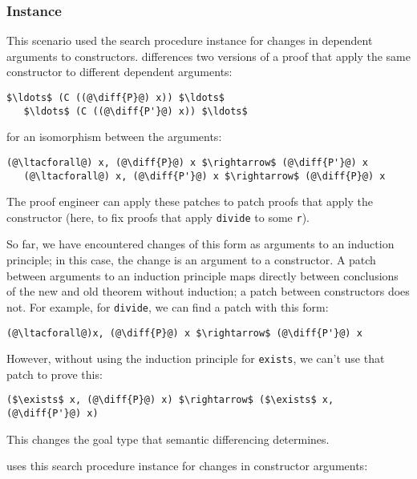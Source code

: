\subsubsection*{Instance}

This scenario used the search procedure instance for changes in dependent arguments to constructors.
\sysname differences two versions of a proof that apply the same constructor
to different dependent arguments:

\begin{lstlisting}[language=coq]
   $\ldots$ (C ((@\diff{P}@) x)) $\ldots$
   $\ldots$ (C ((@\diff{P'}@) x)) $\ldots$
\end{lstlisting}
for an isomorphism between the arguments:

\begin{lstlisting}[language=coq]
   (@\ltacforall@) x, (@\diff{P}@) x $\rightarrow$ (@\diff{P'}@) x
   (@\ltacforall@) x, (@\diff{P'}@) x $\rightarrow$ (@\diff{P}@) x
\end{lstlisting}
The proof engineer can apply these patches to patch proofs that apply the constructor (here,
to fix proofs that apply \lstinline{divide} to some \lstinline{r}).

So far, we have encountered changes of this form as arguments to an 
induction principle; in this case, the change is an argument to a constructor.
A patch between arguments to an induction principle maps
directly between conclusions of the new and old theorem without
induction; a patch between constructors does not.
For example, for \lstinline{divide}, we can find a patch with this form:

\begin{lstlisting}[language=coq]
   (@\ltacforall@)x, (@\diff{P}@) x $\rightarrow$ (@\diff{P'}@) x
\end{lstlisting}
However, without using the induction principle for \lstinline{exists}, we can't use that patch to prove this:

\begin{lstlisting}[language=coq]
   ($\exists$ x, (@\diff{P}@) x) $\rightarrow$ ($\exists$ x, (@\diff{P'}@) x)
\end{lstlisting}
This changes the goal type that semantic differencing determines.

\sysname uses this search procedure instance for changes in constructor arguments:

